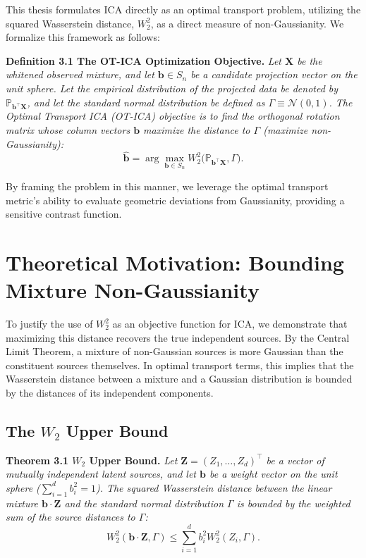 \documentclass[12pt,a4paper,twoside,openany]{book}
\begin{document}
This thesis formulates ICA directly as an optimal transport problem, utilizing the squared Wasserstein distance, $W_2^2$, 
as a direct measure of non-Gaussianity. We formalize this framework as follows:

\vspace{0.5em}
\noindent\textbf{Definition 3.1 The OT-ICA Optimization Objective.} \textit{Let $\mathbf{X}$ be the whitened observed mixture, and 
let $\mathbf{b} \in S_n$ be a candidate projection vector on the unit sphere. Let the empirical distribution of the projected data be 
denoted by $\mathbb{P}_{\mathbf{b}^\top \mathbf{X}}$, and let the standard normal distribution be defined as $\Gamma \equiv \mathcal{N}(0,1)$. 
The Optimal Transport ICA (OT-ICA) objective is to find the orthogonal rotation matrix whose column vectors $\mathbf{b}$ maximize the distance to $\Gamma$ (maximize non-Gaussianity):}
\begin{equation}
    \hat{\mathbf{b}} = \arg\max_{\mathbf{b} \in S_n} W_2^2\big(\mathbb{P}_{\mathbf{b}^\top \mathbf{X}}, \Gamma\big).
\end{equation}
\vspace{0.5em}

By framing the problem in this manner, we leverage the optimal transport metric's ability to evaluate geometric deviations from Gaussianity, providing a sensitive contrast function.

\section{Theoretical Motivation: Bounding Mixture Non-Gaussianity}
To justify the use of $W_2^2$ as an objective function for ICA, we demonstrate that maximizing this distance 
recovers the true independent sources. By the Central Limit Theorem, a mixture of non-Gaussian sources is more Gaussian 
than the constituent sources themselves. In optimal transport terms, this implies that the Wasserstein distance between a mixture 
and a Gaussian distribution is bounded by the distances of its independent components.

\subsection{The $W_2$ Upper Bound}

\vspace{0.5em}
\noindent\textbf{Theorem 3.1 $W_2$ Upper Bound.} \textit{Let $\mathbf{Z} = (Z_1, \dots, Z_d)^\top$ be 
a vector of mutually independent latent sources, and let $\mathbf{b}$ be a weight vector on the unit sphere ($\sum_{i=1}^d b_i^2 = 1$). 
The squared Wasserstein distance between the linear mixture $\mathbf{b} \cdot \mathbf{Z}$ and the 
standard normal distribution $\Gamma$ is bounded by the weighted sum of the source distances to $\Gamma$:}
\begin{equation}
    W_2^2(\mathbf{b} \cdot \mathbf{Z}, \Gamma) \le \sum_{i=1}^d b_i^2 W_2^2(Z_i, \Gamma).
\end{equation}
\end{document}
